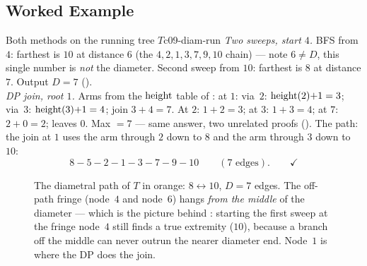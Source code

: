 \subsection{Worked Example}

\begin{example}{Both methods on the running tree $T$}{c09-diam-run}
\emph{Two sweeps, start $4$.} BFS from $4$: farthest is $10$ at distance $6$ (the
$4,2,1,3,7,9,10$ chain) --- note $6 \ne D$, this single number is \emph{not} the
diameter. Second sweep from $10$: farthest is $8$ at distance $7$. Output $D=7$
().\\
\emph{DP join, root $1$.} Arms from the $\operatorname{height}$ table of : at $1$:
via~$2$: $\operatorname{height}(2){+}1=3$; via~$3$: $\operatorname{height}(3){+}1=4$; join $3{+}4=7$. At $2$:
$1{+}2=3$; at $3$: $1{+}3=4$; at $7$: $2{+}0=2$; leaves $0$. Max $=7$ --- same answer,
two unrelated proofs (). The path: the join at $1$ uses the arm
through $2$ down to $8$ and the arm through $3$ down to $10$:
\[
  8 - 5 - 2 - 1 - 3 - 7 - 9 - 10 \qquad (7 \text{ edges}). \qquad\checkmark
\]
\end{example}

\begin{figure}[H]
\centering
{}
\caption{The diametral path of $T$ in orange: $8\leftrightarrow10$, $D=7$ edges. The
off-path fringe (node~$4$ and node~$6$) hangs \emph{from the middle} of the diameter ---
which is the picture behind : starting the first sweep at the fringe
node~$4$ still finds a true extremity ($10$), because a branch off the middle can never
outrun the nearer diameter end. Node~$1$ is where the DP does the join.}
\label{fig:c09-diampath}
\end{figure}

